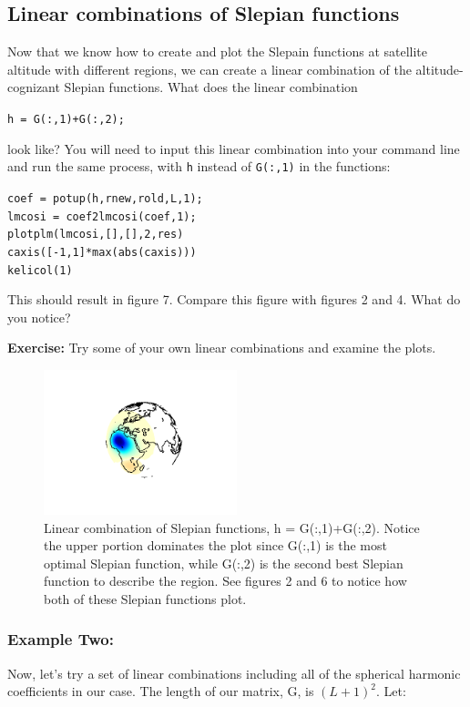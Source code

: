 \documentclass[11pt]{article}
\begin{document}
\subsection{Linear combinations of Slepian functions}

Now that we know how to create and plot the Slepain functions at satellite altitude with different regions, we can create a linear combination of the altitude-cognizant Slepian functions.  What does the linear combination 

\verb|h = G(:,1)+G(:,2);| 

look like?  You will need to input this linear combination into your command line and run the same process, with \verb+h+ instead of \verb+G(:,1)+ in the functions:

\verb+coef = potup(h,rnew,rold,L,1);+\\
\verb+lmcosi = coef2lmcosi(coef,1);+\\
\verb+plotplm(lmcosi,[],[],2,res)+\\
\verb+caxis([-1,1]*max(abs(caxis)))+\\
\verb+kelicol(1)+

This should result in figure 7.  Compare this figure with figures 2 and 4.  What do you notice?

\textbf{Exercise:} Try some of your own linear combinations and examine the plots.

\begin{figure}[H]
  \centering
  \includegraphics[width=0.5\textwidth]{figures/hcombml.png}
  \caption{Linear combination of Slepian functions, h = G(:,1)+G(:,2).  Notice the upper portion dominates the plot since G(:,1) is the most optimal Slepian function, while G(:,2) is the second best Slepian function to describe the region.  See figures 2 and 6 to notice how both of these Slepian functions plot.}
\label{lincomb}
\end{figure}


\subsubsection{Example Two:}
Now, let's try a set of linear combinations including all of the spherical harmonic coefficients in our case.  The length of our matrix, G, is $(L+1)^2$.  Let:
\end{document}

